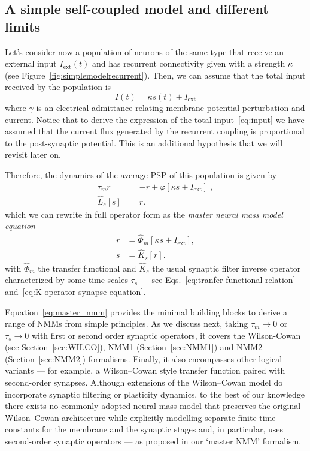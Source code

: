 \documentclass[12pt]{article}
\numberwithin{equation}{section}
\begin{document}
\subsection{A simple self-coupled model and different limits} 
Let's consider now a population of neurons of the same type that receive an external input $I_\text{ext}(t)$
and has recurrent connectivity given with a strength $\kappa$ (see Figure~\ref{fig:simplemodelrecurrent}). 
Then, we can assume that the total input received by the population is
\begin{equation}\label{eq:input}
I(t) = \kappa s(t) + I_\text{ext}
\end{equation}
where $\gamma$ is an electrical admittance relating membrane potential perturbation and current.
Notice that to derive the expression of the total input~\eqref{eq:input} we have assumed
that the current flux generated by the recurrent coupling is proportional to the post-synaptic potential.
This is an additional hypothesis that we will revisit later on.

Therefore, the dynamics of the average PSP of this population is given by
\begin{equation}\label{eq:simpleNMM}
\begin{aligned}
 \tau_m \dot r &= -r + \varphi[\kappa s +  I_\text{ext}] \;,\\
 \hat L_s[s] &= r.
 \end{aligned}
\end{equation}
which we can rewrite in full operator form as the\textit{ master neural mass model equation}
\begin{equation}\label{eq:master_nmm}
 \boxed{\begin{aligned}
 r &=  \hat \Phi_m [\kappa s +  I_\text{ext}] ,\\
 s &= \hat K_s [r].
 \end{aligned}}
\end{equation}
with $\hat \Phi_m$ the transfer functional and  $\hat K_s$ the usual synaptic filter inverse operator characterized by some time scales $\tau_s$ --- see Eqs.~\eqref{eq:tranfer-functional-relation} and~\eqref{eq:K-operator-synapse-equation}.

Equation~\ref{eq:master_nmm} provides the minimal building blocks to derive a range
of NMMs from simple principles.  As we discuss next, taking
$\tau_m\to 0$ or $\tau_s\to 0$ with first or second order synaptic operators, it covers the Wilson-Cowan (see Section~\ref{sec:WILCO}), NMM1 (Section~\ref{sec:NMM1}) and NMM2 (Section~\ref{sec:NMM2}) formalisms.   
Finally, it also encompasses other logical variants — for example, a Wilson–Cowan style transfer function paired with second-order synapses. Although extensions of the Wilson–Cowan model do incorporate synaptic filtering or plasticity dynamics, to the best of our knowledge there exists no commonly adopted neural-mass model that preserves the original Wilson–Cowan architecture while explicitly modelling separate finite time constants for the membrane and the synaptic stages and, in particular, uses second-order synaptic operators — as proposed in our ‘master NMM’ formalism.
\end{document}
